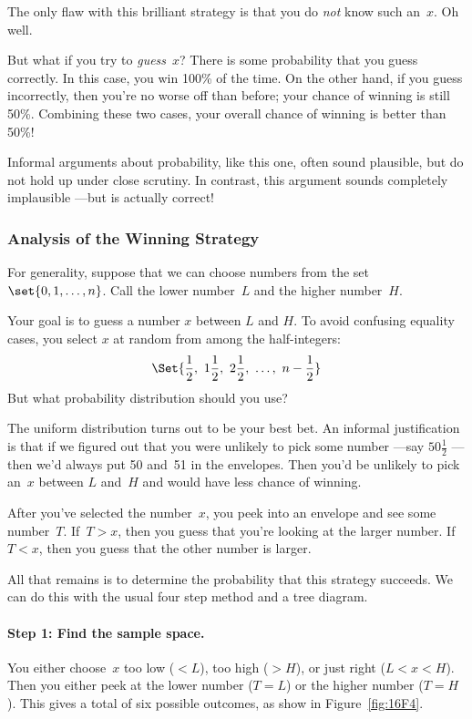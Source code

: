 The only flaw with this brilliant strategy is that you do \emph{not}
know such an~$x$.  Oh well.

But what if you try to \emph{guess}~$x$?  There is some probability
that you guess correctly.  In this case, you win 100\% of the time.
On the other hand, if you guess incorrectly, then you're no worse off
than before; your chance of winning is still 50\%.  Combining these
two cases, your overall chance of winning is better than 50\%!

Informal arguments about probability, like this one, often sound
plausible, but do not hold up under close scrutiny.  In contrast, this
argument sounds completely implausible ---but is actually correct!

\subsubsection{Analysis of the Winning Strategy}

For generality, suppose that we can choose numbers from the set
$\set{0, 1, \dots, n}$.  Call the lower number~$L$ and the higher
number~$H$.

Your goal is to guess a number $x$ between $L$ and $H$.  To avoid
confusing equality cases, you select $x$ at random from among the
half-integers:
%
\[
\Set{\frac{1}{2},\ 1\frac{1}{2},\ 2\frac{1}{2},\ \dots,\ n - \frac{1}{2}}
\]
%
But what probability distribution should you use?

The uniform distribution turns out to be your best bet.  An informal
justification is that if we figured out that you were unlikely to pick
some number ---say $50\frac{1}{2}$ ---then we'd always put 50 and~51
in the envelopes.  Then you'd be unlikely to pick an~$x$ between $L$
and~$H$ and would have less chance of winning.

After you've selected the number~$x$, you peek into an envelope and
see some number~$T$.  If~$T > x$, then you guess that you're looking
at the larger number.  If~$T < x$, then you guess that the other
number is larger.

All that remains is to determine the probability that this strategy
succeeds.  We can do this with the usual four step method and a tree
diagram.

\paragraph{Step 1: Find the sample space.}

You either choose~$x$ too low ($< L$), too high ($> H$), or just right
($L < x < H$).  Then you either peek at the lower number ($T = L$) or
the higher number ($T = H$).  This gives a total of six possible
outcomes, as show in Figure~\ref{fig:16F4}.

